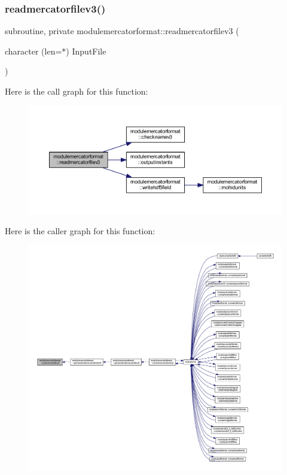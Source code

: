 \subsubsection{\texorpdfstring{readmercatorfilev3()}{readmercatorfilev3()}}
{\footnotesize\ttfamily subroutine, private modulemercatorformat\+::readmercatorfilev3 (\begin{DoxyParamCaption}\item[{character (len=$\ast$)}]{Input\+File }\end{DoxyParamCaption})\hspace{0.3cm}{\ttfamily [private]}}

Here is the call graph for this function\+:\nopagebreak
\begin{figure}[H]
\begin{center}
\leavevmode
\includegraphics[width=350pt]{namespacemodulemercatorformat_a4f174ab179c1ebc3bd16e672df98d3e2_cgraph}
\end{center}
\end{figure}
Here is the caller graph for this function\+:\nopagebreak
\begin{figure}[H]
\begin{center}
\leavevmode
\includegraphics[width=350pt]{namespacemodulemercatorformat_a4f174ab179c1ebc3bd16e672df98d3e2_icgraph}
\end{center}
\end{figure}
\mbox{\label{namespacemodulemercatorformat_a5bdb4983fc890f8f3c9d524bd6516d2c}} 
